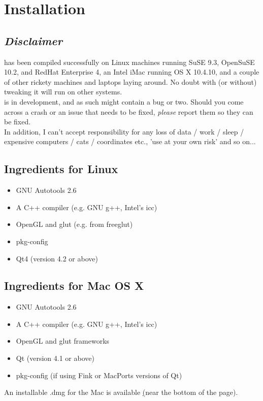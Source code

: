 \chapter{Installation}
\label{sec:install}

\section{\emph{Disclaimer}}
\label{sec:disclaimer}

\progname{} has been compiled successfully on Linux machines running SuSE 9.3, OpenSuSE 10.2, and RedHat Enterprise 4, an Intel iMac running OS X 10.4.10, and a couple of other rickety machines and laptops laying around. No doubt with (or without) tweaking it will run on other systems.\\

\progname{} is in development, and as such might contain a bug or two. Should you come across a crash or an issue that needs to be fixed, \emph{please} report them so they can be fixed.\\

In addition, I can't accept responsibility for any loss of data / work / sleep / expensive computers / cats / coordinates etc., 'use at your own risk' and so on...\\

\section{Ingredients for Linux}
\label{sec:linuxinstall}
\begin{itemize}
	\item GNU Autotools 2.6
	\item A C++ compiler (e.g. GNU g++, Intel's icc)
	\item OpenGL and glut (e.g. from freeglut)
	\item pkg-config
	\item Qt4 (version 4.2 or above)
\end{itemize}

\section{Ingredients for Mac OS X}
\label{sec:macinstall}
\begin{itemize}
	\item GNU Autotools 2.6
	\item A C++ compiler (e.g. GNU g++, Intel's icc)
	\item OpenGL and glut frameworks
	\item Qt (version 4.1 or above)
	\item pkg-config (if using Fink or MacPorts versions of Qt)
\end{itemize}
An installable .dmg for the Mac is available \href{from http://trolltech.com/developer/downloads/qt/mac} (near the bottom of the page).

